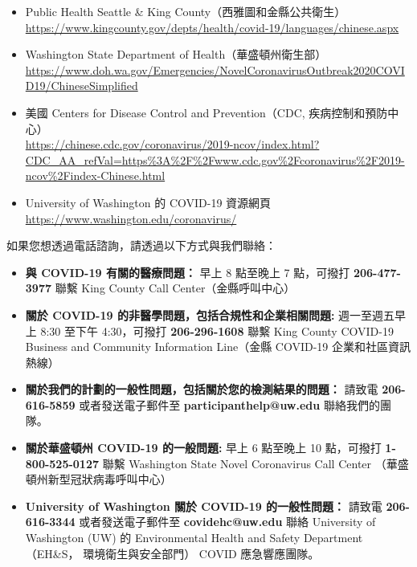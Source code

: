 \documentclass[10pt]{article}
\begin{document}
\begin{itemize}
\item
  Public Health \textemdash Seattle \& King County（西雅圖和金縣公共衛生）\\
  \url{https://www.kingcounty.gov/depts/health/covid-19/languages/chinese.aspx}

\item

  Washington State Department of Health（華盛頓州衛生部）\\
  \url{https://www.doh.wa.gov/Emergencies/NovelCoronavirusOutbreak2020COVID19/ChineseSimplified}

\item
  美國 Centers for Disease Control and Prevention（CDC, 疾病控制和預防中心）\\
  \url{https://chinese.cdc.gov/coronavirus/2019-ncov/index.html?CDC\_AA\_refVal=https%3A%2F%2Fwww.cdc.gov%2Fcoronavirus%2F2019-ncov%2Findex-Chinese.html}

\item
  University of Washington 的 COVID-19 資源網頁\\
  \url{https://www.washington.edu/coronavirus/}

\end{itemize}

如果您想透過電話諮詢，請透過以下方式與我們聯絡：

\begin{itemize}

\item

  \textbf{與 COVID-19 有關的醫療問題：} 早上 8 點至晚上 7 點，可撥打
  \textbf{206-477-3977} 聯繫 King County Call Center（金縣呼叫中心）

\item

  \textbf{關於 COVID-19 的非醫學問題，包括合規性和企業相關問題:} 週一至週五早上 8:30
  至下午 4:30，可撥打 \textbf{206-296-1608} 聯繫 King County COVID-19 Business and Community
  Information Line（金縣 COVID-19 企業和社區資訊熱線）

\item
  \textbf{關於我們的計劃的一般性問題，包括關於您的檢測結果的問題：} 請致電
  \textbf{206-616-5859} 或者發送電子郵件至 \textbf{participanthelp@uw.edu}
  聯絡我們的團隊。

\item

  \textbf{關於華盛頓州 COVID-19 的一般問題:} 早上 6 點至晚上 10 點，可撥打
  \textbf{1-800-525-0127} 聯繫 Washington State Novel Coronavirus Call Center
  （華盛頓州新型冠狀病毒呼叫中心）

\item

  \textbf{University of Washington 關於 COVID-19 的一般性問題：} 請致電
  \textbf{206-616-3344} 或者發送電子郵件至 \textbf{covidehc@uw.edu} 聯絡 University
  of Washington (UW) 的 Environmental Health and Safety Department （EH\&S，
  環境衛生與安全部門） COVID 應急響應團隊。

\end{itemize}
\end{document}
